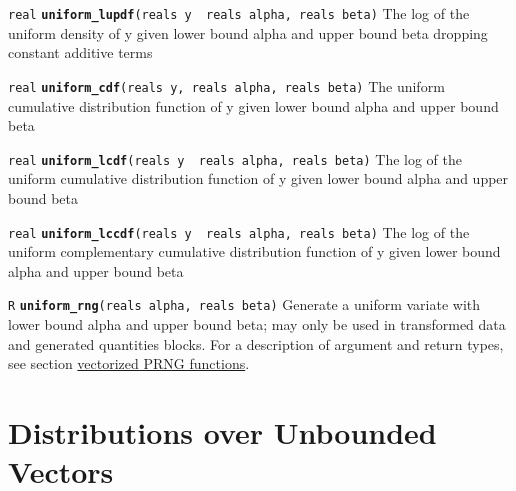 \documentclass[
  10pt,
]{book}
\begin{document}

\texttt{real} \textbf{\texttt{uniform\_lupdf}}\texttt{(reals\ y\ \textbar{}\ reals\ alpha,\ reals\ beta)}\newline
The log of the uniform density of y given lower bound alpha and upper
bound beta dropping constant additive terms


\texttt{real} \textbf{\texttt{uniform\_cdf}}\texttt{(reals\ y,\ reals\ alpha,\ reals\ beta)}\newline
The uniform cumulative distribution function of y given lower bound
alpha and upper bound beta


\texttt{real} \textbf{\texttt{uniform\_lcdf}}\texttt{(reals\ y\ \textbar{}\ reals\ alpha,\ reals\ beta)}\newline
The log of the uniform cumulative distribution function of y given
lower bound alpha and upper bound beta


\texttt{real} \textbf{\texttt{uniform\_lccdf}}\texttt{(reals\ y\ \textbar{}\ reals\ alpha,\ reals\ beta)}\newline
The log of the uniform complementary cumulative distribution function
of y given lower bound alpha and upper bound beta


\texttt{R} \textbf{\texttt{uniform\_rng}}\texttt{(reals\ alpha,\ reals\ beta)}\newline
Generate a uniform variate with lower bound alpha and upper bound
beta; may only be used in transformed data and generated quantities blocks. For a
description of argument and return types, see section
\protect\hyperlink{prng-vectorization}{vectorized PRNG functions}.

\hypertarget{distributions-over-unbounded-vectors}{%
\chapter{Distributions over Unbounded Vectors}\label{distributions-over-unbounded-vectors}}
\end{document}
